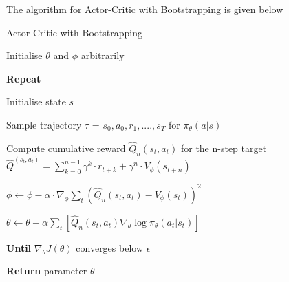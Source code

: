 \documentclass{article}
\begin{document}
The algorithm for Actor-Critic with Bootstrapping is given below \cite{plaat-deeprl}
\begin{algorithm}[htbp]
\caption{Actor-Critic with Bootstrapping}
\SetAlgoLined
\DontPrintSemicolon
\small %
Initialise $\theta$ and $\phi$ arbitrarily\;\\
\item \textbf{Repeat} \;\\
{
    \item Initialise state $s$\;
    \item Sample trajectory $\tau$ = ${s_0,a_0,r_1,....,s_T}$ for $\pi_\theta(a|s)$
     \item 
    {
     \item Compute cumulative reward $\hat{Q}_n(s_t,a_t)$ for the n-step target
     \newline \(\hat{Q}^(s_t,a_t) = \sum_{k=0}^{n-1}\gamma^k\cdot r_{t+k} + \gamma^{n} \cdot V_\phi (s_{t+n})\)
    }
}
    \item $\phi \leftarrow \phi - \alpha \cdot \nabla_\phi \sum_t (\hat{Q}_n(s_t, a_t) - V_\phi(s_t))^2$ \;
    \item $\theta \leftarrow \theta + \alpha \sum_t [\hat{Q}_n(s_t, a_t) \nabla_\theta \log \pi_\theta(a_t | s_t)]$\;
\item \textbf{Until} $\nabla_\theta J(\theta)$ converges below $\epsilon$ \;
\item \textbf{Return} parameter $\theta$
\end{algorithm}
\end{document}
